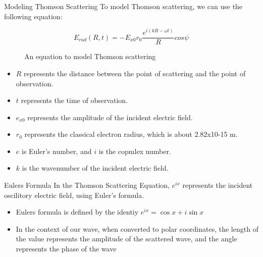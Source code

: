 \documentclass[aspectratio=169]{beamer}
\begin{document}
\begin{frame}[t]{Modeling Thomson Scattering}
	To model Thomson scattering, we can use the following equation:
				
	\begin{figure}
		$$ E_{rad}(R, t) = -E_{x0} {r_0} \frac{e^{i(kR-\omega t)}}{R} cos \psi$$
		\caption{An equation to model Thomson scattering}
	\end{figure}
	
	\begin{scriptsize}
		\begin{itemize}
	\item $R$ represents the distance between the point of scattering and the point of observation.
						
	\item $t$ represents the time of observation.
						
	\item $e_{x0}$ represents the amplitude of the incident electric field.
						
	\item $r_0$ represents the classical electron radius, which is about 2.82x10-15 m.
						
	\item $e$ is Euler's number, and $i$ is the copmlex number.
						
	\item $k$ is the wavenumber of the incident electric field.
		\end{itemize}
	\end{scriptsize}						
\end{frame}
	
\begin{frame}[t]{Eulers Formula}
	In the Thomson Scattering Equation, $e^{ix}$ represents the incident oscilitory electric field, using Euler's formula.
				
	\begin{itemize}
		\item Eulers formula is defined by the identiy $ e^{ix} = \cos x + i \sin x $
		\item In the context of our wave, when converted to polar coordinates, the length of the value represents the amplitude of the scattered wave, and the angle represents the phase of the wave
	\end{itemize}
\end{frame}
\end{document}
